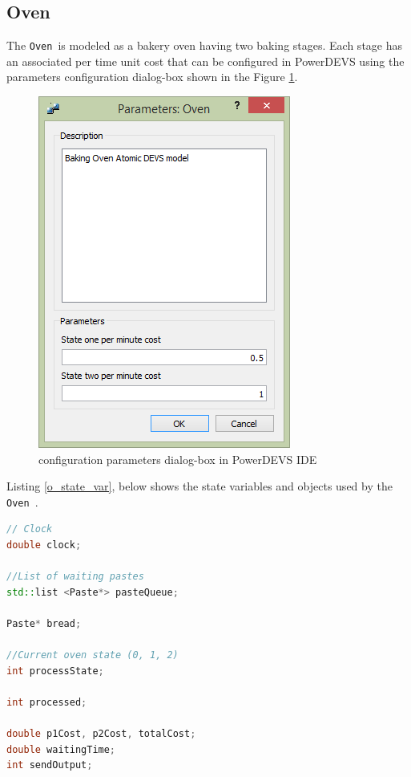 \documentclass[titlepage]{article}%
\newcommand{\oven}{\texttt{Oven}~}
\begin{document}
{\subsection{Oven}
The \oven is modeled as a bakery oven having two baking stages. Each stage has an associated per time unit cost that can be configured in PowerDEVS using the parameters configuration dialog-box shown in the Figure \ref{fig:oven_params}.
\begin{figure}[htbp]
	\centering
		\includegraphics[scale=0.8]{oven_params.PNG}
	\caption{{} configuration parameters dialog-box in PowerDEVS IDE}
	\label{fig:oven_params}
\end{figure}

Listing \ref{o_state_var}, below shows the state variables and objects used by the \oven.

\begin{lstlisting}[caption={State variables and objects used by \oven}, language=c++, label={o_state_var}]
// Clock
double clock;

//List of waiting pastes
std::list <Paste*> pasteQueue;

Paste* bread;

//Current oven state (0, 1, 2)
int processState;

int processed;

double p1Cost, p2Cost, totalCost;
double waitingTime;
int sendOutput;

\end{lstlisting}

}
\end{document}
